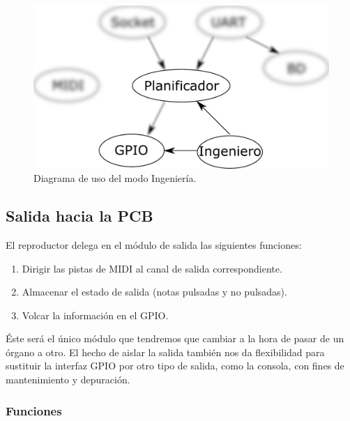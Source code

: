 \smallskip

\begin{figure}[H]
	\noindent \begin{centering}
		\includegraphics[width=\linewidth/2]{capitulo4/daemon_engineer}
		\par\end{centering}
	\smallskip
	\caption{\label{fig:daemon_engineer} Diagrama de uso del modo Ingeniería.}
\end{figure} 

\smallskip

\subsection{Salida hacia la PCB}
\label{subsec:output}

El reproductor delega en el módulo de salida las siguientes funciones:

\begin{enumerate}
	\item Dirigir las pistas de \acrshort{MIDI} al canal de salida correspondiente.
	\item Almacenar el estado de salida (notas pulsadas y no pulsadas).
	\item Volcar la información en el \acrshort{GPIO}.
\end{enumerate}

Éste será el único módulo que tendremos que cambiar a la hora de pasar de un órgano a otro. El hecho de aislar la salida también nos da flexibilidad para sustituir la interfaz \acrshort{GPIO} por otro tipo de salida, como la consola, con fines de mantenimiento y depuración.

\subsubsection{Funciones}

